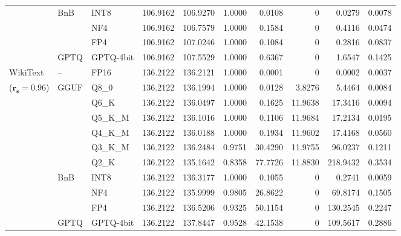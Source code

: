 \begin{table}[t]
{\begin{tabular}{ll l rrrrrrr}
 & BnB & INT8 & 106.9162 & 106.9270 & 1.0000 & 0.0108 & \cellcolor{cyan!12} $0$ & 0.0279 & 0.0078 \\
 &  & NF4 & 106.9162 & 106.7579 & 1.0000 & 0.1584 & \cellcolor{cyan!12} $0$ & 0.4116 & 0.0474 \\
 &  & FP4 & 106.9162 & 107.0246 & 1.0000 & 0.1084 & \cellcolor{cyan!12} $0$ & 0.2816 & 0.0837 \\
 & GPTQ & GPTQ-4bit & 106.9162 & 107.5529 & 1.0000 & 0.6367 & \cellcolor{cyan!12} $0$ & 1.6547 & 0.1425 \\
\midrule
WikiText & -- & FP16 & 136.2122 & 136.2121 & 1.0000 & 0.0001 & \cellcolor{cyan!12} $0$ & 0.0002 & 0.0037 \\
{\small ($\mathbf{r_s{=}0.96}$)} & GGUF & Q8\_0 & 136.2122 & 136.1994 & 1.0000 & 0.0128 & 3.8276 & 5.4464 & 0.0084 \\
 &  & Q6\_K & 136.2122 & 136.0497 & 1.0000 & 0.1625 & 11.9638 & 17.3416 & 0.0094 \\
 &  & Q5\_K\_M & 136.2122 & 136.1016 & 1.0000 & 0.1106 & 11.9684 & 17.2134 & 0.0195 \\
 &  & Q4\_K\_M & 136.2122 & 136.0188 & 1.0000 & 0.1934 & 11.9602 & 17.4168 & 0.0560 \\
 &  & Q3\_K\_M & 136.2122 & 136.2484 & 0.9751 & 30.4290 & 11.9755 & 96.0237 & 0.1211 \\
 &  & Q2\_K & 136.2122 & 135.1642 & \cellcolor{red!18} 0.8358 & \cellcolor{red!18} 77.7726 & 11.8830 & \cellcolor{red!18} 218.9432 & \cellcolor{red!18} 0.3534 \\
 & BnB & INT8 & 136.2122 & 136.3177 & 1.0000 & 0.1055 & \cellcolor{cyan!12} $0$ & 0.2741 & 0.0059 \\
 &  & NF4 & 136.2122 & 135.9999 & 0.9805 & 26.8622 & \cellcolor{cyan!12} $0$ & 69.8174 & 0.1505 \\
 &  & FP4 & 136.2122 & 136.5206 & \cellcolor{red!18} 0.9325 & \cellcolor{red!18} 50.1154 & \cellcolor{cyan!12} $0$ & \cellcolor{red!18} 130.2545 & \cellcolor{red!18} 0.2247 \\
 & GPTQ & GPTQ-4bit & 136.2122 & 137.8447 & 0.9528 & 42.1538 & \cellcolor{cyan!12} $0$ & 109.5617 & 0.2886 \\
\bottomrule
\end{tabular}}
\end{table}